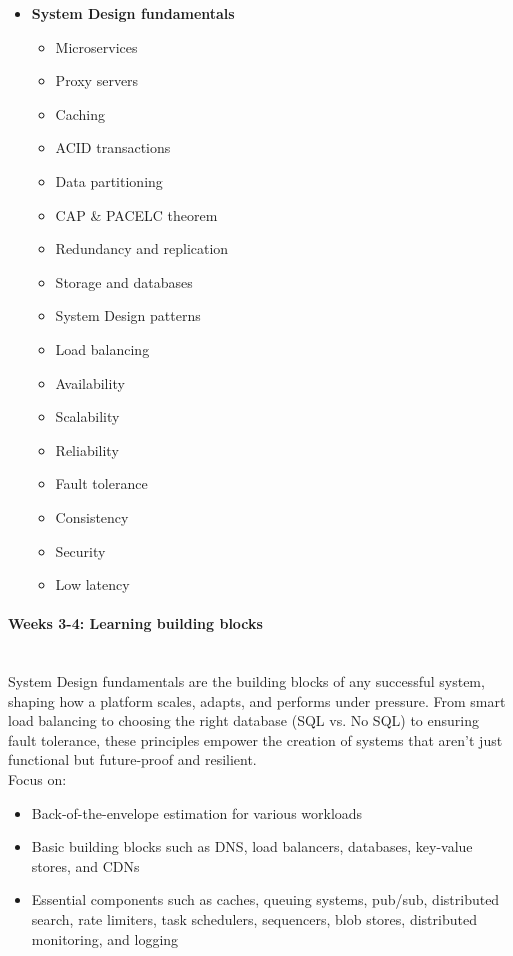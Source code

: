 \vspace{0.3cm}
\begin{itemize}
\item \textbf{System Design fundamentals}
\begin{itemize}
\item Microservices
\item Proxy servers
\item Caching
\item ACID transactions
\item Data partitioning
\item CAP \& PACELC theorem
\item Redundancy and replication
\item Storage and databases
\item System Design patterns
\item Load balancing
\item Availability
\item Scalability
\item Reliability
\item Fault tolerance
\item Consistency
\item Security
\item Low latency
\end{itemize}
\end{itemize}

\paragraph{Weeks 3-4: Learning building blocks}\label{7k8hp6Z24e35BpWOj0rro}
\\
System Design fundamentals are the building blocks of any successful system, shaping how a platform scales, adapts, and performs under pressure. From smart load balancing to choosing the right database (SQL vs. No SQL) to ensuring fault tolerance, these principles empower the creation of systems that aren't just functional but future-proof and resilient.
\\
Focus on:

\begin{itemize}
\item
\protect{}\label{tjmqWT6x_1tUIHWmpilbu}
Back-of-the-envelope estimation for various workloads
\item
\protect{}\label{fGHfrFQitXTpWFPXlqtBM}
Basic building blocks such as DNS, load balancers, databases, key-value stores, and CDNs
\item
\protect{}\label{trxOoMtlGsrAfStXsZKQr}
Essential components such as caches, queuing systems, pub/sub, distributed search, rate limiters, task schedulers, sequencers, blob stores, distributed monitoring, and logging
\end{itemize}
\\
